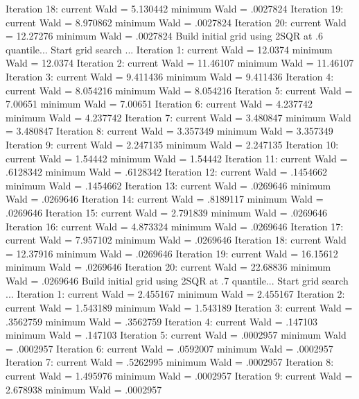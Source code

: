 Iteration    18:  current Wald =  5.130442         minimum Wald =  .0027824
Iteration    19:  current Wald =  8.970862         minimum Wald =  .0027824
Iteration    20:  current Wald =  12.27276         minimum Wald =  .0027824
{\smallskip}
Build initial grid using 2SQR at .6 quantile...
{\smallskip}
Start grid search ...
Iteration     1:  current Wald =   12.0374         minimum Wald =   12.0374
Iteration     2:  current Wald =  11.46107         minimum Wald =  11.46107
Iteration     3:  current Wald =  9.411436         minimum Wald =  9.411436
Iteration     4:  current Wald =  8.054216         minimum Wald =  8.054216
Iteration     5:  current Wald =   7.00651         minimum Wald =   7.00651
Iteration     6:  current Wald =  4.237742         minimum Wald =  4.237742
Iteration     7:  current Wald =  3.480847         minimum Wald =  3.480847
Iteration     8:  current Wald =  3.357349         minimum Wald =  3.357349
Iteration     9:  current Wald =  2.247135         minimum Wald =  2.247135
Iteration    10:  current Wald =   1.54442         minimum Wald =   1.54442
Iteration    11:  current Wald =  .6128342         minimum Wald =  .6128342
Iteration    12:  current Wald =  .1454662         minimum Wald =  .1454662
Iteration    13:  current Wald =  .0269646         minimum Wald =  .0269646
Iteration    14:  current Wald =  .8189117         minimum Wald =  .0269646
Iteration    15:  current Wald =  2.791839         minimum Wald =  .0269646
Iteration    16:  current Wald =  4.873324         minimum Wald =  .0269646
Iteration    17:  current Wald =  7.957102         minimum Wald =  .0269646
Iteration    18:  current Wald =  12.37916         minimum Wald =  .0269646
Iteration    19:  current Wald =  16.15612         minimum Wald =  .0269646
Iteration    20:  current Wald =  22.68836         minimum Wald =  .0269646
{\smallskip}
Build initial grid using 2SQR at .7 quantile...
{\smallskip}
Start grid search ...
Iteration     1:  current Wald =  2.455167         minimum Wald =  2.455167
Iteration     2:  current Wald =  1.543189         minimum Wald =  1.543189
Iteration     3:  current Wald =  .3562759         minimum Wald =  .3562759
Iteration     4:  current Wald =   .147103         minimum Wald =   .147103
Iteration     5:  current Wald =  .0002957         minimum Wald =  .0002957
Iteration     6:  current Wald =  .0592007         minimum Wald =  .0002957
Iteration     7:  current Wald =  .5262995         minimum Wald =  .0002957
Iteration     8:  current Wald =  1.495976         minimum Wald =  .0002957
Iteration     9:  current Wald =  2.678938         minimum Wald =  .0002957

